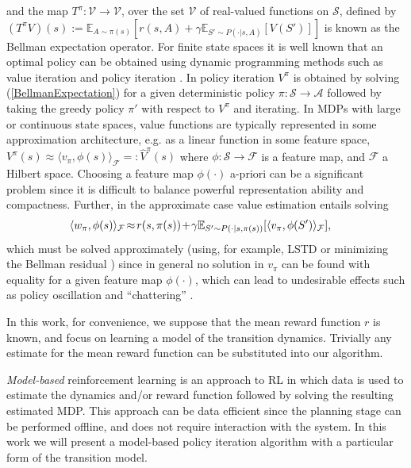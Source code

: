 \documentclass[letterpaper]{article}
\newcommand{\BertsekasDynamic}{BertsekasDynamic}
\newcommand{\BradtkeLSTD}{DBLP:journals/ml/BradtkeB96}
\newcommand{\BairdBRmin}{DBLP:conf/icml/Baird95}
\newcommand{\BellmanValueIt}{Bellman:1957}
\newcommand{\HowardPolicyIt}{howard:dp}
\newcommand{\cF}{{\mathcal F}}
\newcommand{\cA}{{\mathcal A}}
\newcommand{\cS}{{\mathcal S}}
\newcommand{\cV}{{\mathcal V}}
\newcommand{\E}{{\mathbb E}}
\newcommand{\lang}{\langle}
\newcommand{\rang}{\rangle}
\newcommand{\nn}{\nonumber}
\begin{document}
and the map $T^{\pi}:\cV\to\cV$, over the set $\cV$ of real-valued functions on $\cS$, defined by $(T^{\pi}V)(s):=  \E_{A\sim\pi(s)} [ r(s,A) + \gamma \E_{S'\sim P(\cdot|s,A)} [V(S')] ] $ is known as the Bellman expectation operator. For finite state spaces it is well known that an optimal policy can be obtained using dynamic programming methods such as value iteration \citep{\BellmanValueIt} and policy iteration \citep{\HowardPolicyIt}. In policy iteration $V^\pi$ is obtained by solving (\ref{BellmanExpectation}) for a given deterministic policy $\pi:\cS\to\cA$ followed by taking the greedy policy $\pi'$ with respect to $V^\pi$ and iterating.
In MDPs with large or continuous state spaces, value functions are typically represented in some approximation architecture, e.g. as a linear function in some feature space, $V^\pi(s)\approx  \lang v_\pi,\phi(s) \rang_\cF =: \hat V^\pi(s)$ where $\phi:\cS\to\cF$ is a feature map, and $\cF$ a Hilbert space. Choosing a feature map $\phi(\cdot)$ a-priori can be a significant problem since it is difficult to balance powerful representation ability and compactness. Further, in the approximate case value estimation entails solving
\begin{align}
&\lang w_\pi , \phi(s) \rang_{\cF}\hspace{-0.5mm}\approx \hspace{-0.5mm}r(s,\pi(s)) \hspace{-0.5mm}+\hspace{-0.5mm}  \gamma \E_{S'\sim P(\cdot|s,\pi(s))} [\lang v_\pi , \phi(S')\rang_{\cF}] ,\nn
\end{align}
which must be solved approximately (using, for example, LSTD \citep{\BradtkeLSTD} or minimizing the Bellman residual \citep{\BairdBRmin}) since in general no solution in $v_\pi$ can be found with equality for a given feature map $\phi(\cdot)$, which can lead to undesirable effects such as policy oscillation and ``chattering'' \citep[see e.g.][]{\BertsekasDynamic}.

In this work, for convenience, we suppose that the mean reward function $r$ is known, and focus on learning a model of the transition dynamics. Trivially any estimate for the mean reward function can be substituted into our algorithm. 

\emph{Model-based} reinforcement learning is an approach to RL in which data is used to estimate the dynamics and/or reward function followed by solving the resulting estimated MDP. This approach can be data efficient since the planning stage can be performed offline, and does not require interaction with the system. In this work we will present a model-based policy iteration algorithm with a particular form of the transition model.
\end{document}
